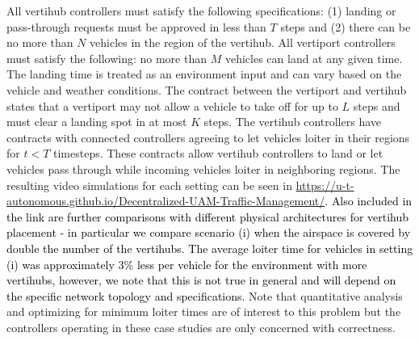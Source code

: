 All vertihub controllers must satisfy the following specifications: (1) landing or pass-through requests must be approved in less than $T$ steps and (2) there can be no more than $N$ vehicles in the region of the vertihub. 
All vertiport controllers must satisfy the following: no more than $M$ vehicles can land at any given time. The landing time is treated as an environment input and can vary based on the vehicle and weather conditions. The contract between the vertiport and vertihub states that a vertiport may not allow a vehicle to take off for up to $L$ steps and must clear a landing spot in at most $K$ steps. The vertihub controllers have contracts with connected controllers agreeing to let vehicles loiter in their regions for $t < T$ timesteps. These contracts allow vertihub controllers to land or let vehicles pass through while incoming vehicles loiter in neighboring regions.
The resulting video simulations for each setting can be seen in  \href{https://u-t-autonomous.github.io/Decentralized-UAM-Traffic-Management/}{https://u-t-autonomous.github.io/Decentralized-UAM-Traffic-Management/}.
\textcolor{black}{Also included in the link are further comparisons with different physical architectures for vertihub placement - in particular we compare scenario (i) when the airspace is covered by double the number of the vertihubs. The average loiter time for vehicles in setting (i) was approximately 3\% less per vehicle for the environment with more vertihubs, however, we note that this is not true in general and will depend on the specific network topology and specifications.}
Note that quantitative analysis and optimizing for minimum loiter times are of interest to this problem but the controllers operating in these case studies are only concerned with correctness.

